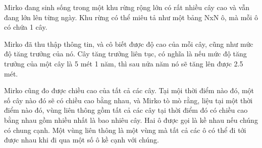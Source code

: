 Mirko đang sinh sống trong một khu rừng rộng lớn có rất nhiều cây cao và vẫn đang lớn lên từng ngày. Khu rừng có thể miêu tả như một bảng NxN ô, mà mỗi ô có chứa 1 cây.  

   Mirko đã thu thập thông tin, và cô biết được độ cao của mỗi cây, cũng như mức độ tăng trưởng của nó. Cây tăng trưởng liên tục, có nghĩa là nếu mức độ tăng trưởng của một cây là 5 mét 1 năm, thì sau nửa năm nó sẽ tăng lên được 2.5 mét.  

   Mirko cũng đo được chiều cao của tất cả các cây. Tại mội thời điểm nào đó, một số cây nào đó sẽ có chiều cao bằng nhau, và Mirko tò mò rằng, liệu tại một thời điểm nào đó, vùng liên thông gồm tất cả các cây tại thời điểm đó có chiều cao bằng nhau gồm nhiều nhất là bao nhiêu cây. Hai ô được gọi là kề nhau nếu chúng có chung cạnh. Một vùng liên thông là một vùng mà tất cả các ô có thể đi tới được nhau khi đi qua một số ô kề cạnh với chúng.  

\